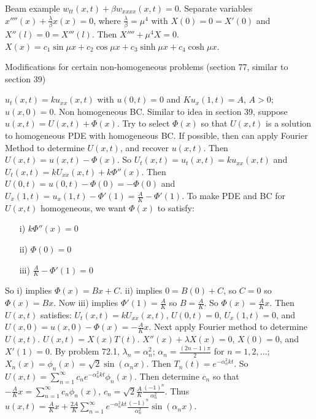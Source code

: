 \documentclass[]{article}
\begin{document}
\begin{recall}
	Beam example $w_{tt}(x,t) + \beta w_{xxxx}(x,t) = 0$. Separate variables $x''''(x) + \frac{\lambda}{\beta} x(x) = 0$, where $\frac{\lambda}{\beta} = \mu^4$ with $X(0) = 0 = X'(0)$ and $X''(l) = 0 = X'''(l)$. Then $X'''' + \mu^4 X = 0$.
	$X(x)  = c_1\sin{\mu x} + c_2 \cos{\mu x} + c_3 \sinh{\mu x} + c_4 \cosh{\mu x}$.
\end{recall}

Modifications for certain non-homogeneous problems (section 77, similar to section 39)
\begin{example}
	$u_t(x,t) = ku_{xx}(x,t)$ with $u(0,t) = 0$ and $Ku_x(1,t) = A$, $A>0$; $u(x,0) = 0$. Non homogeneous BC. Similar to idea in section 39, suppose $u(x,t) = U(x,t)+ \Phi(x)$. Try to select $\Phi(x)$ so that $U(x,t)$ is a solution to homogeneous PDE with homogeneous BC. If possible, then can apply Fourier Method to determine $U(x,t)$, and recover $u(x,t)$.
	Then $U(x,t) = u(x,t) - \Phi(x)$. So $U_t(x,t) = u_t(x,t) = ku_{xx}(x,t)$ and $U_t(x,t) = kU_{xx}(x,t) + k\Phi''(x)$. Then $U(0,t) = u(0,t) - \Phi(0) = -\Phi(0)$ and $U_x(1,t) = u_x(1,t) - \Phi'(1) = \frac{A}{K} - \Phi'(1)$. To make PDE and BC for $U(x,t)$ homogeneous, we want $\Phi(x)$ to satisfy:
	\begin{enumerate}
		\item[i)] $k\Phi''(x) = 0$
		\item[ii)] $\Phi(0) = 0$
		\item[iii)] $\frac{A}{K} - \Phi'(1) = 0$
	\end{enumerate}
	So i) implies $\Phi(x) = Bx+C$. ii) implies $0 = B(0) + C$, so $C = 0$ so $\Phi(x) = Bx$. Now iii) implies $\Phi'(1) = \frac{A}{K}$ so $B = \frac{A}{K}$. So $\Phi(x) = \frac{A}{K}x$.
	Then $U(x,t)$ satisfies: $U_t(x,t) = kU_{xx}(x,t)$, $U(0,t) = 0$, $U_x(1,t) = 0$, and $U(x,0) = u(x,0) - \Phi(x) = -\frac{A}{K}x$. Next apply Fourier method to determine $U(x,t)$. $U(x,t) = X(x) T(t)$. $X''(x) + \lambda X(x) = 0$, $X(0) = 0$, and $X'(1) = 0$. By problem 72.1, $\lambda_n = \alpha_n^2$; $\alpha_n = \frac{(2n-1)\pi}{2}$ for $n=1,2,\dots$; $X_n(x) = \phi_n(x) = \sqrt{2} \sin{(\alpha_n x)}$. Then $T_n(t) = e^{-\alpha_n^2 kt}$. So $U(x,t) = \sum_{n=1}^\infty c_n e^{-\alpha_n^2 kt} \phi_n(x)$.  Then determine $c_n$ so that $-\frac{A}{K}x = \sum_{n=1}^\infty c_n \phi_n(x)$, $c_n = \sqrt{2} \frac{A}{K} \frac{(-1)^n}{\alpha_n^2}$. Thus $u(x,t) = \frac{A}{K}x + \frac{2A}{K} \sum_{n=1}^\infty e^{-\alpha_n^2 kt} \frac{(-1)^n}{\alpha_n^2} \sin{(\alpha_n x)}$.
\end{example}
\end{document}
